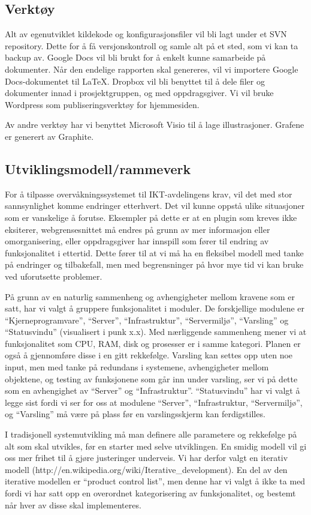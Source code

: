 \subsection{Verktøy}
Alt av egenutviklet kildekode og konfigurasjonsfiler vil bli lagt under et SVN repository. Dette for å få versjonskontroll og samle alt på et sted, som vi kan ta backup av. Google Docs vil bli brukt for å enkelt kunne samarbeide på dokumenter. Når den endelige rapporten skal genereres, vil vi importere Google Docs-dokumentet til LaTeX. Dropbox vil bli benyttet til å dele filer og dokumenter innad i prosjektgruppen, og med oppdragsgiver. Vi vil bruke Wordpress som publiseringsverktøy for hjemmesiden.

Av andre verktøy har vi benyttet Microsoft Visio til å lage illustrasjoner. Grafene er generert av Graphite.

\subsection{Utviklingsmodell/rammeverk}
For å tilpasse overvåkningssystemet til IKT-avdelingens krav, vil det med stor sannsynlighet komme endringer etterhvert. Det vil kunne oppstå ulike situasjoner som er vanskelige å forutse. Eksempler på dette er at en plugin som kreves ikke eksiterer, webgrensesnittet må endres på grunn av mer informasjon eller omorganisering, eller oppdragsgiver har innspill som fører til endring av funksjonalitet i ettertid. Dette fører til at vi må ha en fleksibel modell med tanke på endringer og tilbakefall, men med begrensninger på hvor mye tid vi kan bruke ved uforutsette problemer.

På grunn av en naturlig sammenheng og avhengigheter mellom kravene som er satt, har vi valgt å gruppere funksjonalitet i moduler. De forskjellige modulene er “Kjerneprogramvare”, “Server”, “Infrastruktur”, “Servermiljø”, “Varsling” og “Statusvindu” (visualisert i punk x.x). Med nærliggende sammenheng mener vi at funksjonalitet som CPU, RAM, disk og prosesser er i samme kategori. Planen er også å gjennomføre disse i en gitt rekkefølge. Varsling kan settes opp uten noe input, men med tanke på redundans i systemene, avhengigheter mellom objektene, og testing av funksjonene som går inn under varsling, ser vi på dette som en avhengighet av “Server” og “Infrastruktur”. “Statusvindu” har vi valgt å legge sist fordi vi ser for oss at modulene “Server”, “Infrastruktur, “Servermiljø”, og “Varsling” må være på plass før en varslingsskjerm kan ferdigstilles.

I tradisjonell systemutvikling må man definere alle parametere og rekkefølge på alt som skal utvikles, før en starter med selve utviklingen. En smidig modell vil gi oss mer frihet til å gjøre justeringer underveis. Vi har derfor valgt en iterativ modell (http://en.wikipedia.org/wiki/Iterative\_development). En del av den iterative modellen er “product control list”, men denne har vi valgt å ikke ta med fordi vi har satt opp en overordnet kategorisering av funksjonalitet, og bestemt når hver av disse skal implementeres.

